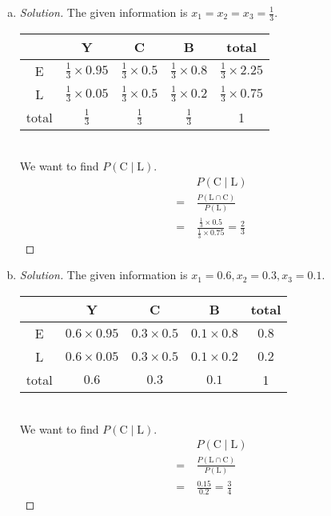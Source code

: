 	\begin{enumerate} [(a)]
		\item \begin{proof} [Solution]
			The given information is $x_1 = x_2 = x_3 = \frac{1}{3}$.
			\begin{table}[htb!]
				\setlength{\tabcolsep}{10pt}
				\renewcommand{\arraystretch}{2}
				\centering
				\begin{tabular}{c|ccc|c}
					& Y               & C              & B              & total \\ \hline
					E     & $\frac{1}{3}\times0.95$ & $\frac{1}{3}\times0.5$ & $\frac{1}{3}\times0.8$ & $\frac{1}{3}\times2.25$     \\
					L     & $\frac{1}{3}\times0.05$ & $\frac{1}{3}\times0.5$ & $\frac{1}{3}\times0.2$ & $\frac{1}{3}\times0.75$     \\ \hline
					total & $\frac{1}{3}$           & $\frac{1}{3}$          & $\frac{1}{3}$          & 1    
				\end{tabular}
			\end{table}\\
			We want to find $P(\mbox{C}\mid \mbox{L})$.
			\begin{align*}
				& P(\mbox{C}\mid \mbox{L})\\
				=\ & \frac{P(\mbox{L}\cap\mbox{C})}{P(\mbox{L})}\\
				=\ & \frac{\frac{1}{3}\times0.5}{\frac{1}{3}\times0.75} = \frac{2}{3}
			\end{align*}
		\end{proof}
		\newpage
		\item \begin{proof} [Solution]
			The given information is $x_1 = 0.6, x_2 = 0.3, x_3 = 0.1$.
			\begin{table}[htb!]
				\setlength{\tabcolsep}{10pt}
				\renewcommand{\arraystretch}{2}
				\centering
				\begin{tabular}{c|ccc|c}
					& Y               & C              & B              & total \\ \hline
					E     & $0.6\times0.95$ & $0.3\times0.5$ & $0.1\times0.8$ & $0.8$     \\
					L     & $0.6\times0.05$ & $0.3\times0.5$ & $0.1\times0.2$ & $0.2$     \\ \hline
					total & $0.6$           & $0.3$          & $0.1$          & 1    
				\end{tabular}
			\end{table}\\
			We want to find $P(\mbox{C}\mid \mbox{L})$.
			\begin{align*}
				& P(\mbox{C}\mid \mbox{L})\\
				=\ & \frac{P(\mbox{L}\cap\mbox{C})}{P(\mbox{L})}\\
				=\ & \frac{0.15}{0.2} = \frac{3}{4}
			\end{align*}
		\end{proof}
	\end{enumerate}